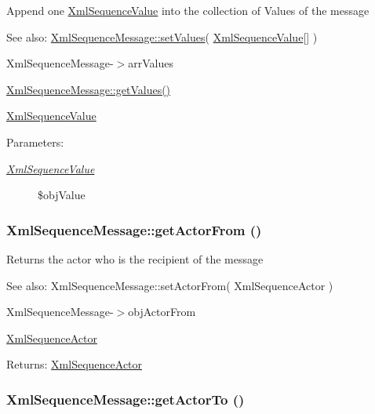Append one \hyperlink{class_xml_sequence_value}{XmlSequenceValue} into the collection of Values of the message

\begin{Desc}
\item[See also:]\hyperlink{class_xml_sequence_message_4ed3a9eceec6ce84566098813fde6101}{XmlSequenceMessage::setValues}( \hyperlink{class_xml_sequence_value}{XmlSequenceValue}\mbox{[}\mbox{]} ) 

XmlSequenceMessage-$>$arrValues 

\hyperlink{class_xml_sequence_message_9c2e8f8d995477aad79640ad673ab6a9}{XmlSequenceMessage::getValues()} 

\hyperlink{class_xml_sequence_value}{XmlSequenceValue} \end{Desc}
\begin{Desc}
\item[Parameters:]
\begin{description}
\item[{\em \hyperlink{class_xml_sequence_value}{XmlSequenceValue}}]\$objValue \end{description}
\end{Desc}
\hypertarget{class_xml_sequence_message_d174306473bc3ba17083bd0c2c100443}{
\subsubsection[{getActorFrom}]{\setlength{\rightskip}{0pt plus 5cm}XmlSequenceMessage::getActorFrom ()}}
\label{class_xml_sequence_message_d174306473bc3ba17083bd0c2c100443}


Returns the actor who is the recipient of the message

\begin{Desc}
\item[See also:]XmlSequenceMessage::setActorFrom( XmlSequenceActor ) 

XmlSequenceMessage-$>$objActorFrom 

\hyperlink{class_xml_sequence_actor}{XmlSequenceActor} \end{Desc}
\begin{Desc}
\item[Returns:]\hyperlink{class_xml_sequence_actor}{XmlSequenceActor} \end{Desc}
\hypertarget{class_xml_sequence_message_d67a02882cb2602e3171f012650160f6}{
\subsubsection[{getActorTo}]{\setlength{\rightskip}{0pt plus 5cm}XmlSequenceMessage::getActorTo ()}}
\label{class_xml_sequence_message_d67a02882cb2602e3171f012650160f6}


